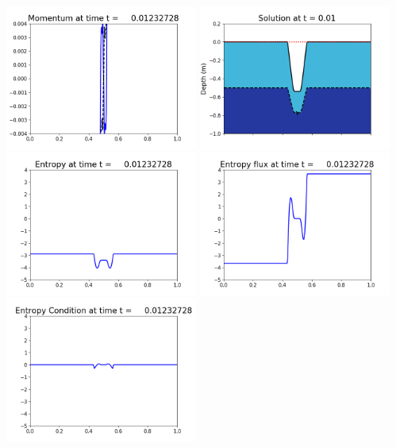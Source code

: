 \documentclass[11pt]{article}
\begin{document}
\vskip 10pt 
\includegraphics[width=0.475\textwidth]{frame0036fig1003.png}
\includegraphics[width=0.475\textwidth]{frame0036fig1006.png}
\vskip 10pt 
\includegraphics[width=0.475\textwidth]{frame0036fig1007.png}
\includegraphics[width=0.475\textwidth]{frame0036fig1008.png}
\vskip 10pt 
\includegraphics[width=0.475\textwidth]{frame0036fig1009.png}
\end{document}
